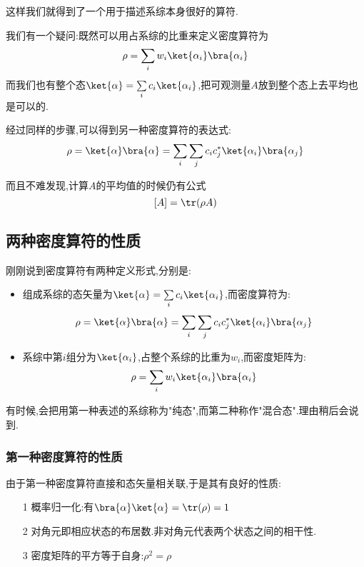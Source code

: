     这样我们就得到了一个用于描述系综本身很好的算符.

    我们有一个疑问:既然可以用占系综的比重来定义密度算符为
    \[\rho=\sum_i w_i \ket{\alpha_i}\bra{\alpha_i}\]
    而我们也有整个态$\ket{\alpha}=\sum\limits_i c_i \ket{\alpha_i}$,把可观测量$A$放到整个态上去平均也是可以的.

    经过同样的步骤,可以得到另一种密度算符的表达式:
    \begin{equation}
      \rho=\ket{\alpha}\bra{\alpha}=\sum_i \sum_j c_i c_j^{*}\ket{\alpha_i}\bra{\alpha_j}
    \end{equation}
    
    而且不难发现,计算$A$的平均值的时候仍有公式
    \[\left[ A \right] =\tr(\rho A)\]

\subsection{两种密度算符的性质}

    刚刚说到密度算符有两种定义形式,分别是:
    \begin{itemize}
        \item 组成系综的态矢量为$\ket{\alpha}=\sum\limits_i c_i\ket{\alpha_i}$,而密度算符为:
            \begin{equation}
              \rho=\ket{\alpha}\bra{\alpha}=\sum_i \sum_j c_i c_j^{*}\ket{\alpha_i}\bra{\alpha_j}
            \end{equation}
        
        \item 系综中第$i$组分为$\ket{\alpha_i}$,占整个系综的比重为$w_i$,而密度矩阵为:
            \begin{equation}
                \rho=\sum_i w_i \ket{\alpha_i}\bra{\alpha_i}
            \end{equation}
            
    \end{itemize}
    有时候,会把用第一种表述的系综称为"纯态",而第二种称作"混合态".理由稍后会说到.

\subsubsection*{第一种密度算符的性质}
    由于第一种密度算符直接和态矢量相关联,于是其有良好的性质:
    \begin{itemize}
        \item[1] 概率归一化:有$\bra{\alpha}\ket{\alpha}=\tr(\rho)=1$
        \item[2] 对角元即相应状态的布居数.非对角元代表两个状态之间的相干性.
        \item[3] 密度矩阵的平方等于自身:$\rho^{2}=\rho$
    \end{itemize}


